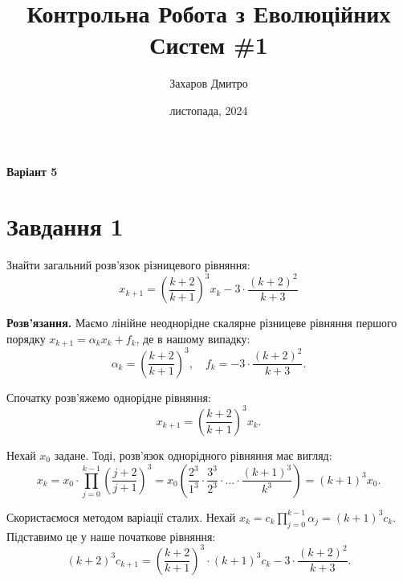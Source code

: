 \documentclass{hw_template}
\title{\huge\sffamily\bfseries Контрольна Робота з Еволюційних Систем \#1}
\author{\Large\sffamily Захаров Дмитро}
\date{\sffamily 3 листопада, 2024}
\begin{document}
\pagestyle{fancy}

\maketitle

\begin{center}
    \textbf{Варіант 5}
\end{center}

\tableofcontents

\pagebreak

\section{Завдання 1}

\begin{problem}
    Знайти загальний розв'язок різницевого рівняння:
    \begin{equation*}
        x_{k+1} = \left(\frac{k+2}{k+1}\right)^3x_k - 3 \cdot \frac{(k+2)^2}{k+3}
    \end{equation*}
\end{problem}

\textbf{Розв'язання.} Маємо лінійне неоднорідне скалярне різницеве рівняння першого порядку
$x_{k+1} = \alpha_k x_k + f_k$, де в нашому випадку:
\begin{equation*}
    \alpha_k = \left(\frac{k+2}{k+1}\right)^3, \quad f_k = -3 \cdot \frac{(k+2)^2}{k+3}.
\end{equation*}

Спочатку розв'яжемо однорідне рівняння:
\begin{equation*}
    x_{k+1} = \left(\frac{k+2}{k+1}\right)^3x_k.
\end{equation*}

Нехай $x_0$ задане. Тоді, розв'язок однорідного рівняння має вигляд:
\begin{equation*}
    x_k = x_0 \cdot \prod_{j=0}^{k-1} \left(\frac{j+2}{j+1}\right)^3 = x_0\left(\frac{2^3}{1^3} \cdot \frac{3^3}{2^3} \cdot \dots \cdot \frac{(k+1)^3}{k^3}\right) = (k+1)^3x_0.
\end{equation*}

Скористаємося методом варіації сталих. Нехай $x_k = c_k\prod_{j=0}^{k-1}\alpha_j = (k+1)^3c_k$. Підставимо це у наше початкове рівняння:
\begin{equation*}
    (k+2)^3c_{k+1} = \left(\frac{k+2}{k+1}\right)^3 \cdot (k+1)^3c_k - 3 \cdot \frac{(k+2)^2}{k+3}.
\end{equation*}
\end{document}
